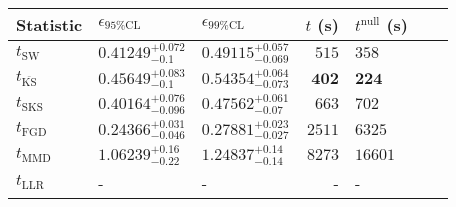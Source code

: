 \begin{tabular}{l|llr|llr}
	Statistic & $\epsilon_{95\%\mathrm{CL}}$ & $\epsilon_{99\%\mathrm{CL}}$ & $t$ (s) & $t^{\mathrm{null}}$ (s) \\
	\midrule
	$t_{\mathrm{SW}}$ & $0.41249_{-0.1}^{+0.072}$ & $0.49115_{-0.069}^{+0.057}$ & $515$ & $358$ \\
	$t_{\overline{\mathrm{KS}}}$ & $0.45649_{-0.1}^{+0.083}$ & $0.54354_{-0.073}^{+0.064}$ & ${\mathbf{402}}$ & ${\mathbf{224}}$ \\
	$t_{\mathrm{SKS}}$ & $0.40164_{-0.096}^{+0.076}$ & $0.47562_{-0.07}^{+0.061}$ & $663$ & $702$ \\
	$t_{\mathrm{FGD}}$ & ${\mathbf{0.24366_{-0.046}^{+0.031}}}$ & ${\mathbf{0.27881_{-0.027}^{+0.023}}}$ & $2511$ & $6325$ \\
	$t_{\mathrm{MMD}}$ & $1.06239_{-0.22}^{+0.16}$ & $1.24837_{-0.14}^{+0.14}$ & $8273$ & $16601$ \\
	$t_{\mathrm{LLR}}$ & - & - & - & - \\
	\bottomrule
\end{tabular}